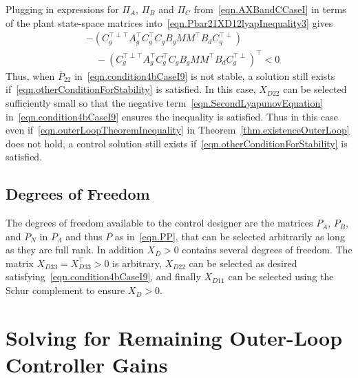 \documentclass[journal]{IEEEtran}
\theoremstyle{innercustomthm}
\begin{document}
  Plugging in expressions for $\Pi_{A}$, $\Pi_{B}$ and $\Pi_{C}$ from\ \eqref{eqn.AXBandCCaseI} in terms of the plant state-space matrices into\ \eqref{eqn.Pbar21XD12lyapInequality3} gives
  {%
    \small
    \begin{equation}
      \label{eqn.otherConditionForStability}
      \begin{split}
        &-(C_{g}^{\top\perp\top}A_{g}^{\top}C_{g}^{\top}C_{g}B_{g}MM^{\top}B_{d}C_{g}^{\top\perp}) \\
        & \quad -
        (C_{g}^{\top\perp\top}A_{g}^{\top}C_{g}^{\top}C_{g}B_{g}MM^{\top}B_{d}C_{g}^{\top\perp})^{\top}
        <0
      \end{split}
    \end{equation}
  }%
  Thus, when $\bar{P}_{22}$ in\ \eqref{eqn.condition4bCaseI9} is not stable, a solution still exists if\ \eqref{eqn.otherConditionForStability} is satisfied.
  In this case, $X_{D22}$ can be selected sufficiently small so that the negative term\ \eqref{eqn.SecondLyapunovEquation} in\ \eqref{eqn.condition4bCaseI9} ensures the inequality is satisfied.
  Thus in this case even if\ \eqref{eqn.outerLoopTheoremInequality} in Theorem~\ref{thm.existenceOuterLoop} does not hold, a control solution still exists if\ \eqref{eqn.otherConditionForStability} is satisfied.

  \subsection{Degrees of Freedom}

  The degrees of freedom available to the control designer are the matrices $P_{A}$, $P_{B}$, and $P_{N}$ in $P_{\Lambda}$ and thus $P$ as in\ \eqref{eqn.PP}, that can be selected arbitrarily as long as they are full rank.
  In addition $X_{D}>0$ contains several degrees of freedom.
  The matrix $X_{D33}=X_{D33}^{\top}>0$ is arbitrary, $X_{D22}$ can be selected as desired satisfying\ \eqref{eqn.condition4bCaseI9}, and finally $X_{D11}$ can be selected using the Schur complement to ensure $X_{D}>0$.

  \section{Solving for Remaining Outer-Loop Controller Gains}
\end{document}
